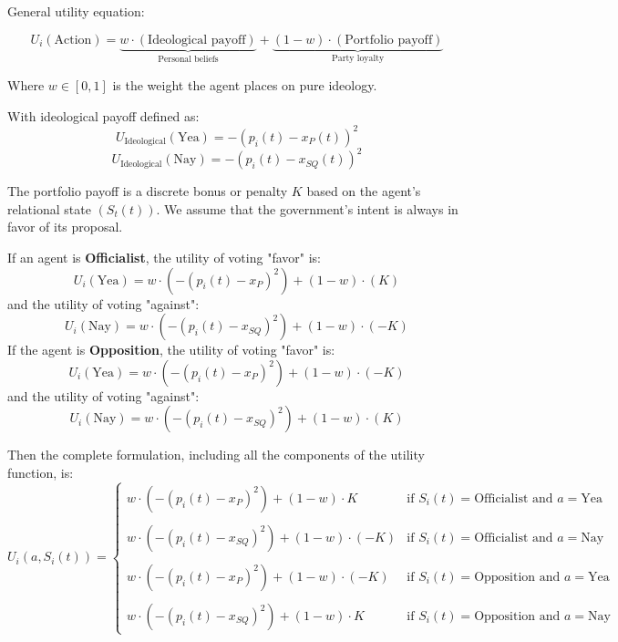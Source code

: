 \documentclass{article}
\begin{document}
	General utility equation:
	
	\begin{equation}\label{utility}
		U_{i}(\text{Action}) = \underbrace{w \cdot (\text{Ideological payoff})}_{\text{Personal beliefs}} + 
		\underbrace{(1 - w) \cdot 
			(\text{Portfolio payoff})}_{\text{Party loyalty}}
	\end{equation}
	
	Where $w \in [0, 1]$ is the weight the agent places on pure ideology.
	
	With ideological payoff defined as:
	\begin{equation}
		U_{\text{Ideological}}(\text{Yea}) = -(p_{i}(t) - x_{P}(t))^{2} 
	\end{equation}
	\begin{equation}
		U_{\text{Ideological}}(\text{Nay}) = -(p_{i}(t) - x_{SQ}(t))^{2}
	\end{equation}
	
	The portfolio payoff is a discrete bonus or penalty $K$ based on the agent's relational state $(S_t(t))$. We assume that the government's intent is always in favor of its proposal.
	
	If an agent is \textbf{Officialist}, the utility of voting "favor" is:
	\begin{equation}
		U_{i}(\text{Yea}) = w \cdot (-(p_{i}(t) - x_{P})^{2}) + (1 - w) \cdot (K)
	\end{equation}
	and the utility of voting "against":
	\begin{equation}
		U_{i}(\text{Nay}) = w \cdot (-(p_{i}(t) - x_{SQ})^{2}) + (1 - w) \cdot (-K)
	\end{equation}
	If the agent is \textbf{Opposition}, the utility of voting "favor" is:
	\begin{equation}
		U_{i}(\text{Yea}) = w \cdot (-(p_{i}(t) - x_{P})^{2}) + (1 - w) \cdot (-K)
	\end{equation}
	and the utility of voting "against":
	\begin{equation}
		U_{i}(\text{Nay}) = w \cdot (-(p_{i}(t) - x_{SQ})^{2}) + (1 - w) \cdot (K)
	\end{equation}
	
	Then the complete formulation, including all the components of the utility function, is:
	\begin{equation}
		U_i(a, S_i(t)) = 
		\begin{cases} 
			w \cdot (-(p_i(t) - x_P)^2) + (1-w) \cdot K & \text{if } S_i(t) = \text{Officialist} \text{ and } a = \text{Yea} \\
			\\
			w \cdot (-(p_i(t) - x_{SQ})^2) + (1-w) \cdot (-K) & \text{if } S_i(t) = \text{Officialist} \text{ and } a = \text{Nay} \\
			\\
			w \cdot (-(p_i(t) - x_P)^2) + (1-w) \cdot (-K) & \text{if } S_i(t) = \text{Opposition} \text{ and } a = \text{Yea} \\
			\\
			w \cdot (-(p_i(t) - x_{SQ})^2) + (1-w) \cdot K & \text{if } S_i(t) = \text{Opposition} \text{ and } a = \text{Nay} 
		\end{cases}
	\end{equation}
	
\end{document}
